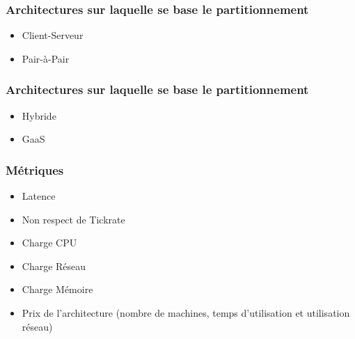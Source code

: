 \documentclass{beamer}
\begin{document}
\begin{frame}
  \frametitle{Architectures sur laquelle se base le partitionnement}
  \begin{itemize}
    \item{Client-Serveur\hspace{1cm}}
    \item{Pair-à-Pair\hspace{1.5cm}}
  \end{itemize}
\end{frame}

\begin{frame}
  \frametitle{Architectures sur laquelle se base le partitionnement}
  \begin{itemize}
    \item{Hybride\vspace{5mm}}
    \item{GaaS\hspace{1cm}}
  \end{itemize}
\end{frame}

\begin{frame}
  \frametitle{Métriques}
  \begin{itemize}
    \item{Latence}
    \item{Non respect de Tickrate}
    \item{Charge CPU}
    \item{Charge Réseau}
    \item{Charge Mémoire}
    \item{Prix de l'architecture (nombre de machines, temps d'utilisation et utilisation réseau)}
  \end{itemize}
\end{frame}
\end{document}
